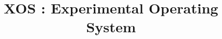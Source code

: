 \documentclass{sig-alternate}
\begin{document}
%

\title{XOS : Experimental Operating System }

%
%
%
%
%
\end{document}

